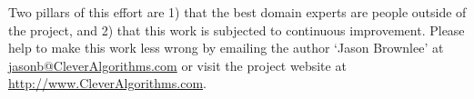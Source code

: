 \documentclass[a4paper, 11pt]{article}
\makeatletter
\newcommand{\myreportauthor}{Jason Brownlee}
\newcommand{\myreportemail}{jasonb@CleverAlgorithms.com}
\newcommand{\myreportwebsite}{http://www.CleverAlgorithms.com}
\makeatother
\begin{document}
Two pillars of this effort are 1) that the best domain experts are people outside of the project, and 2) that this work is subjected to continuous improvement. 
Please help to make this work less wrong by emailing the author `\myreportauthor' at \url{\myreportemail} or visit the project website at \url{\myreportwebsite}.



\end{document}
